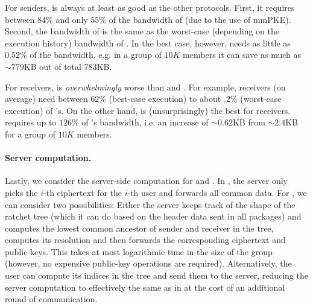 For senders, \saik is always at least as good as the other protocols. First, it requires between $84\%$ and only $55\%$
of the bandwidth of \protITK (due to the use of mmPKE). Second, the bandwidth of \protCMPKE is the same as the
worst-case (depending on the execution history) bandwidth of \saik. In the best case, however, \saik needs as little as
$0.52\%$ of the bandwidth, e.g. in a group of $10K$ members it can save as much as $\sim 779$KB out of total
$783$KB.





For receivers, \protITK is \emph{overwhelmingly} worse than \saik and \protCMPKE. For
example, \saik receivers (on average) need between $62\%$ (best-case execution) to about $.2\%$ (worst-case execution)
of \protITK's. On the other hand, \protCMPKE is (unsurprisingly) the best for receivers.  \saik requires up to $126\%$
of \protCMPKE's bandwidth, i.e. an increase of $\sim 0.62$KB from $\sim 2.4$KB for a group of $10K$ members.


\paragraph{Server computation.}
Lastly, we consider the server-side computation for \saik and \protCMPKE. In \protCMPKE, the server only picks the
$i$-th \mPKE ciphertext for the $i$-th user and forwards all common data. For \saik, we can consider two possibilities:
Either the server keeps track of the shape of the ratchet tree (which it can do based on the header data sent in all
packages) and computes the lowest common ancestor of sender and receiver in the tree, computes its resolution and then
forwards the corresponding ciphertext and public keys. This takes at most logarithmic time in the size of the
group (however, no expensive public-key operations are required). Alternatively, the user can compute its indices in the
tree and send them to the server, reducing the server computation to effectively the same as in \protCMPKE at the cost
of an additional round of communication.

